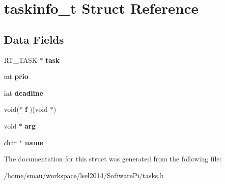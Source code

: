 \hypertarget{structtaskinfo__t}{\section{taskinfo\-\_\-t Struct Reference}
\label{structtaskinfo__t}
}
\subsection*{Data Fields}
\begin{DoxyCompactItemize}
\item 
\hypertarget{structtaskinfo__t_a0cb1f1c02a99ef3f44badfca22e514e6}{R\-T\-\_\-\-T\-A\-S\-K $\ast$ {\bfseries task}}\label{structtaskinfo__t_a0cb1f1c02a99ef3f44badfca22e514e6}

\item 
\hypertarget{structtaskinfo__t_a1e9ebd8d44c3cc311783dd655f63fa4e}{int {\bfseries prio}}\label{structtaskinfo__t_a1e9ebd8d44c3cc311783dd655f63fa4e}

\item 
\hypertarget{structtaskinfo__t_a73210d575d02627afb5bb5c576dd16fe}{int {\bfseries deadline}}\label{structtaskinfo__t_a73210d575d02627afb5bb5c576dd16fe}

\item 
\hypertarget{structtaskinfo__t_a7f8bb634684703736143ef904715981d}{void($\ast$ {\bfseries f} )(void $\ast$)}\label{structtaskinfo__t_a7f8bb634684703736143ef904715981d}

\item 
\hypertarget{structtaskinfo__t_a31543d6535122611f920b2e113c2df4d}{void $\ast$ {\bfseries arg}}\label{structtaskinfo__t_a31543d6535122611f920b2e113c2df4d}

\item 
\hypertarget{structtaskinfo__t_a193ca0526c879aefa073279d7ca9f32c}{char $\ast$ {\bfseries name}}\label{structtaskinfo__t_a193ca0526c879aefa073279d7ca9f32c}

\end{DoxyCompactItemize}


The documentation for this struct was generated from the following file\-:\begin{DoxyCompactItemize}
\item 
/home/smau/workspace/lsel2014/\-Software\-Pi/tasks.\-h\end{DoxyCompactItemize}
